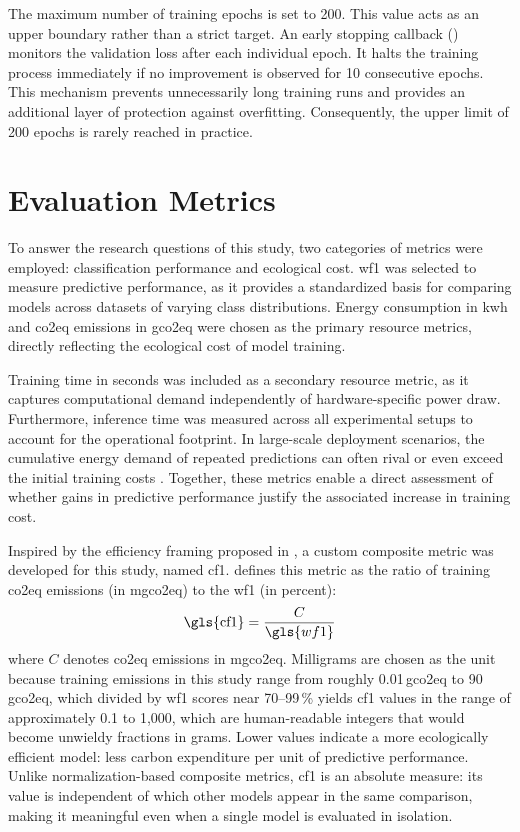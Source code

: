 The maximum number of training epochs is set to 200. This value acts as an upper boundary rather than a strict target. An early stopping callback () monitors the validation loss after each individual epoch. It halts the training process immediately if no improvement is observed for 10 consecutive epochs. This mechanism prevents unnecessarily long training runs and provides an additional layer of protection against overfitting. Consequently, the upper limit of 200 epochs is rarely reached in practice.

\section{Evaluation Metrics}
\label{design_metrics}

To answer the research questions of this study, two categories of metrics were employed: classification performance and ecological cost.
\Gls{wf1} was selected to measure predictive performance, as it provides a standardized basis for comparing models across datasets of varying class distributions.
Energy consumption in \gls{kwh} and \gls{co2eq} emissions in \gls{gco2eq} were chosen as the primary resource metrics, directly reflecting the ecological cost of model training.

Training time in seconds was included as a secondary resource metric, as it captures computational demand independently of hardware-specific power draw.
Furthermore, inference time was measured across all experimental setups to account for the operational footprint. In large-scale deployment scenarios, the cumulative energy demand of repeated predictions can often rival or even exceed the initial training costs \cite{desislavovTrendsAIInference2023}.
Together, these metrics enable a direct assessment of whether gains in predictive performance justify the associated increase in training cost.

Inspired by the efficiency framing proposed in \citeauthor{schwartzGreenAI2020} \cite{schwartzGreenAI2020}, a custom composite metric was developed for this study, named \gls{cf1}.  defines this metric as the ratio of training \gls{co2eq} emissions (in \gls{mgco2eq}) to the \gls{wf1} (in percent):
\begin{equation}
\text{\gls{cf1}} = \frac{C}{\gls{wf1}}
\label{eq:cf1}
\end{equation}
where $C$ denotes \gls{co2eq} emissions in \gls{mgco2eq}. Milligrams are chosen as the unit because training emissions in this study range from roughly 0.01\,\gls{gco2eq} to 90\,\gls{gco2eq}, which divided by \gls{wf1} scores near 70--99\,\% yields \gls{cf1} values in the range of approximately 0.1 to 1{,}000, which are human-readable integers that would become unwieldy fractions in grams. Lower values indicate a more ecologically efficient model: less carbon expenditure per unit of predictive performance. Unlike normalization-based composite metrics, \gls{cf1} is an absolute measure: its value is independent of which other models appear in the same comparison, making it meaningful even when a single model is evaluated in isolation.

